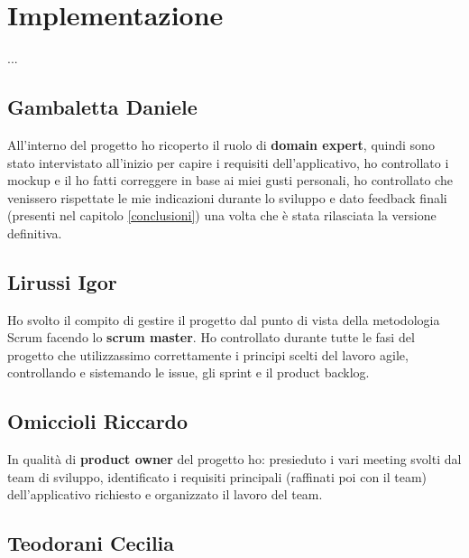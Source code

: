 
\chapter{Implementazione}
...
    \section{Gambaletta Daniele}
    All'interno del progetto ho ricoperto il ruolo di \textbf{domain expert}, quindi sono stato intervistato all'inizio per capire i requisiti dell'applicativo, ho controllato i mockup e il ho fatti correggere in base ai miei gusti personali, ho controllato che venissero rispettate le mie indicazioni durante lo sviluppo e dato feedback finali (presenti nel capitolo \ref{conclusioni}) una volta che è stata rilasciata la versione definitiva.
    
    \section{Lirussi Igor}
    Ho svolto il compito di gestire il progetto dal punto di vista della metodologia Scrum facendo lo \textbf{scrum master}. Ho controllato durante tutte le fasi del progetto che utilizzassimo correttamente i principi scelti del lavoro agile, controllando e sistemando le issue, gli sprint e il product backlog.
    
    \section{Omiccioli Riccardo}
   In qualità di \textbf{product owner} del progetto ho: presieduto i vari meeting svolti dal team di sviluppo, identificato i requisiti principali (raffinati poi con il team) dell'applicativo richiesto e organizzato il lavoro del team.
    
    \section{Teodorani Cecilia}